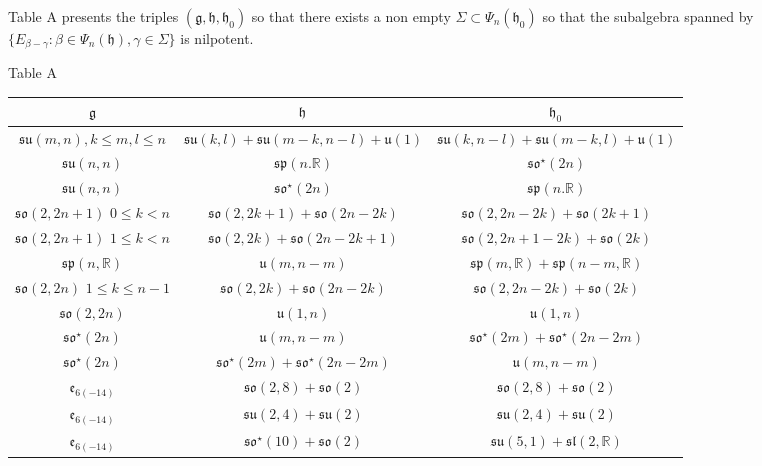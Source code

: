 \documentclass[12pt]{amsart}
\theoremstyle{definition}
\theoremstyle{remark}
\newcommand{\e}{\mathfrak{e}}
\newcommand{\g}{\mathfrak{g}}
\newcommand{\h}{\mathfrak{h}}
\renewcommand{\u}{{\mathfrak u}}
\newcommand{\R}{{\mathbb R}}
\numberwithin{equation}{section}
\begin{document}
\begin{center}
Table A presents the triples $(\g, \h, \h_0)$ so that there exists a non empty $\Sigma \subset \Psi_n(\h_0)$  so that the subalgebra spanned by $\{E_{\beta -\gamma} : \beta \in \Psi_n(\h), \gamma \in \Sigma\}$ is  nilpotent.
\end{center}
\begin{center}
Table A
\begin{tabular}{|c| c | c|}
\hline   $\g$  &   $\h \, $   &  $\h_0 \,   $     \\
 \hline   $\mathfrak{su}(m,n), k\leq m, l \leq n$   &     $\mathfrak{su}(k,l)+\mathfrak{su}(m-k,n-l)+ \u(1)$ & $\mathfrak{su}(k,n-l)+\mathfrak{su}(m-k,l)+ \u(1)$    \\
  \hline   $\mathfrak{su}(n,n) $   &     $\mathfrak{sp}(n.\R) $ & $\mathfrak{so}^\star(2n) $    \\
   \hline   $\mathfrak{su}(n,n) $   &     $\mathfrak{so}^\star(2n)$ & $\mathfrak{sp}(n.\R) $    \\
\hline   $\mathfrak{so}(2,2n+1)$ $0\leq k<n$ & $\mathfrak{so}(2,2k+1)+ \mathfrak{so}(2n-2k)$ & $\mathfrak{so}(2,2n-2k)+ \mathfrak{so}(2k+1)$       \\
\hline   $\mathfrak{so}(2,2n+1)$ $1\leq k<n$ & $\mathfrak{so}(2,2k)+ \mathfrak{so}(2n-2k+1)$ & $\mathfrak{so}(2,2n+1-2k)+ \mathfrak{so}(2k)$       \\
\hline   $\mathfrak{sp}(n, \mathbb R)$  & $\mathfrak{u}(m,n-m)$ & $\mathfrak{sp}(m, \mathbb R)+ \mathfrak{sp}(n-m, \mathbb R)$       \\
 \hline   $\mathfrak{so}(2,2n)$ $1\leq k \leq n-1$  & $\mathfrak{so}(2,2k)+ \mathfrak{so}(2n-2k)$   & $\mathfrak{so}(2,2n-2k)+ \mathfrak{so}(2k)$      \\
 \hline   $\mathfrak{so}(2,2n)$   & $\mathfrak{u}(1,n) $   & $\mathfrak{u}(1,n) $      \\
\hline   $\mathfrak{so}^\star (2n)$  & $\mathfrak{u}(m,n-m)$ & $\mathfrak{so}^\star(2m)+ \mathfrak{so}^\star(2n-2m)$       \\
\hline   $\mathfrak{so}^\star (2n)$  & $ \mathfrak{so}^\star(2m)+ \mathfrak{so}^\star(2n-2m)$ & $\mathfrak{u}(m,n-m) $       \\
\hline $\e_{6(-14)}$ & $\mathfrak{so}(2,8)+\mathfrak{so}(2) $ & $\mathfrak{so}(2,8)+\mathfrak{so}(2)$ \\
\hline $\e_{6(-14)}$ & $\mathfrak{su}(2,4)+\mathfrak{su}(2) $ & $\mathfrak{su}(2,4)+\mathfrak{su}(2)$ \\
\hline $\e_{6(-14)}$ & $\mathfrak{so}^\star(10)+\mathfrak{so}(2) $ & $\mathfrak{su}(5,1)+\mathfrak{sl}(2, \mathbb R)$ \\

\end{tabular}
\end{center}
\end{document}
